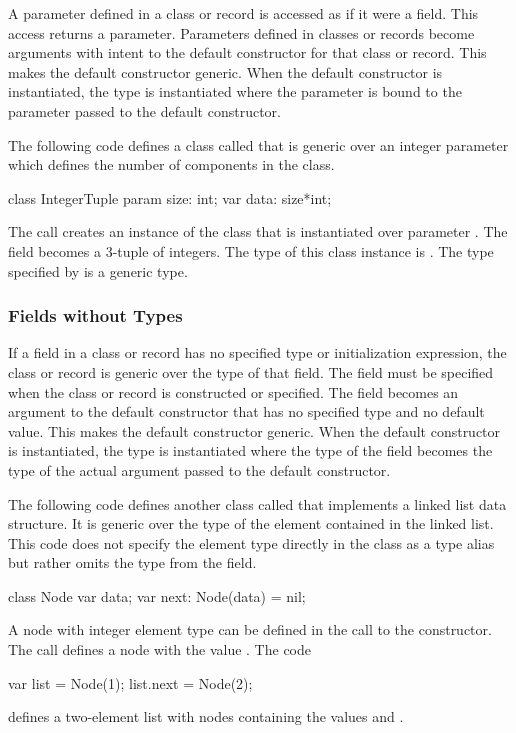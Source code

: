 A parameter defined in a class or record is accessed as if it were a
field.  This access returns a parameter.  Parameters defined in
classes or records become arguments with intent  to the
default constructor for that class or record.  This makes the default
constructor generic.  When the default constructor is instantiated,
the type is instantiated where the parameter is bound to the parameter
passed to the default constructor.

\begin{example}
The following code defines a class called  that is
generic over an integer parameter which defines the number of
components in the class.
\begin{chapel}
class IntegerTuple {
  param size: int;
  var data: size*int;
}
\end{chapel}
The call  creates an instance of the
 class that is instantiated over parameter
.  The field  becomes a 3-tuple of integers.  The
type of this class instance is .  The type
specified by  is a generic type.
\end{example}

\subsubsection{Fields without Types}
\label{Fields_without_Types}

If a field in a class or record has no specified type or
initialization expression, the class or record is generic over the
type of that field.  The field must be specified when the class or
record is constructed or specified.  The field becomes an argument to
the default constructor that has no specified type and no default
value.  This makes the default constructor generic.  When the default
constructor is instantiated, the type is instantiated where the type
of the field becomes the type of the actual argument passed to the
default constructor.

\begin{example}
The following code defines another class called  that
implements a linked list data structure.  It is generic over the type
of the element contained in the linked list.  This code does not
specify the element type directly in the class as a type alias but
rather omits the type from the  field.
\begin{chapel}
class Node {
  var data;
  var next: Node(data) = nil;
}
\end{chapel}
A node with integer element type can be defined in the call to the
constructor.  The call  defines a node with the value
.  The code
\begin{chapel}
var list = Node(1);
list.next = Node(2);
\end{chapel}
defines a two-element list with nodes containing the values 
and .
\end{example}

